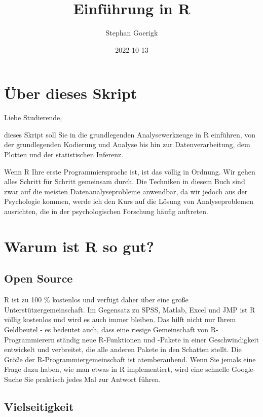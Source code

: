\documentclass[
]{book}
\title{Einführung in R}
\author{Stephan Goerigk}
\date{2022-10-13}
\begin{document}
\maketitle

{
\setcounter{tocdepth}{1}
\tableofcontents
}
\hypertarget{uxfcber-dieses-skript}{%
\chapter*{Über dieses Skript}\label{uxfcber-dieses-skript}}

Liebe Studierende,

dieses Skript soll Sie in die grundlegenden Analysewerkzeuge in R einführen, von der grundlegenden Kodierung und Analyse bis hin zur Datenverarbeitung, dem Plotten und der statistischen Inferenz.

Wenn R Ihre erste Programmiersprache ist, ist das völlig in Ordnung. Wir gehen alles Schritt für Schritt gemeinsam durch. Die Techniken in diesem Buch sind zwar auf die meisten Datenanalyseprobleme anwendbar, da wir jedoch aus der Psychologie kommen, werde ich den Kurs auf die Lösung von Analyseproblemen ausrichten, die in der psychologischen Forschung häufig auftreten.

\hypertarget{warum-ist-r-so-gut}{%
\chapter{Warum ist R so gut?}\label{warum-ist-r-so-gut}}

\hypertarget{open-source}{%
\section{Open Source}\label{open-source}}

R ist zu 100 \% kostenlos und verfügt daher über eine große Unterstützergemeinschaft. Im Gegensatz zu SPSS, Matlab, Excel und JMP ist R völlig kostenlos und wird es auch immer bleiben. Das hilft nicht nur Ihrem Geldbeutel - es bedeutet auch, dass eine riesige Gemeinschaft von R-Programmierern ständig neue R-Funktionen und -Pakete in einer Geschwindigkeit entwickelt und verbreitet, die alle anderen Pakete in den Schatten stellt. Die Größe der R-Programmiergemeinschaft ist atemberaubend. Wenn Sie jemals eine Frage dazu haben, wie man etwas in R implementiert, wird eine schnelle Google-Suche Sie praktisch jedes Mal zur Antwort führen.

\hypertarget{vielseitigkeit}{%
\section{Vielseitigkeit}\label{vielseitigkeit}}
\end{document}
